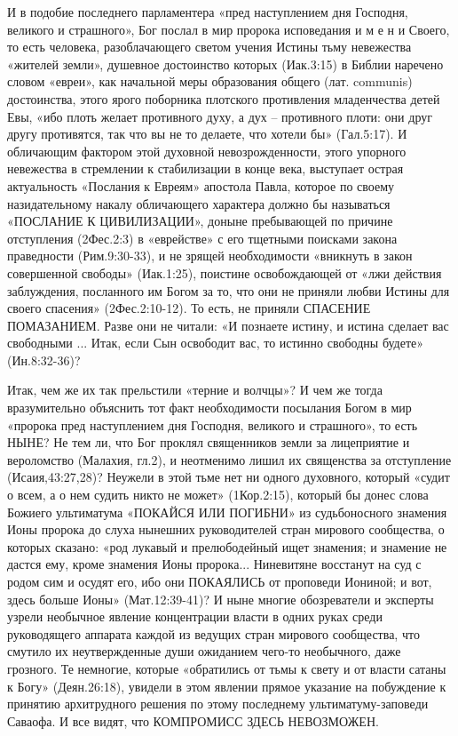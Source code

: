      И в подобие последнего парламентера «пред наступлением дня Господня, великого и страшного», Бог послал в мир пророка исповедания  и м е н и  Своего, то есть человека, разоблачающего светом учения Истины тьму невежества «жителей земли», душевное достоинство которых (Иак.3:15) в Библии наречено словом «евреи», как начальной меры образования общего (лат. communis) достоинства, этого ярого поборника плотского противления младенчества детей Евы, «ибо плоть желает противного духу, а дух – противного плоти: они друг другу противятся, так что вы не то делаете, что хотели бы» (Гал.5:17).
И обличающим фактором этой духовной невозрожденности, этого упорного невежества в стремлении к стабилизации в конце века, выступает острая актуальность «Послания к Евреям» апостола Павла, которое по своему назидательному накалу обличающего характера должно бы называться «ПОСЛАНИЕ К ЦИВИЛИЗАЦИИ», доныне пребывающей по причине отступления (2Фес.2:3) в «еврействе» с его тщетными поисками закона праведности (Рим.9:30-33), и не зрящей необходимости «вникнуть в закон совершенной свободы» (Иак.1:25), поистине освобождающей от «лжи действия заблуждения, посланного им Богом за то, что они не приняли любви Истины для своего спасения» (2Фес.2:10-12). То есть, не приняли  СПАСЕНИЕ  ПОМАЗАНИЕМ. Разве они не читали: «И познаете истину, и истина сделает вас свободными ... Итак, если Сын освободит вас, то истинно свободны будете» (Ин.8:32-36)?

      Итак, чем же их так прельстили «терние и волчцы»?
      И чем же тогда вразумительно объяснить тот факт необходимости посылания Богом в мир «пророка пред наступлением дня Господня, великого и страшного», то есть НЫНЕ? Не тем ли, что Бог проклял священников земли за лицеприятие и вероломство (Малахия, гл.2), и неотменимо лишил их священства за отступление (Исаия,43:27,28)?     Неужели в этой тьме нет ни одного духовного, который «судит о всем, а о нем судить никто не может» (1Кор.2:15), который бы донес слова Божиего ультиматума  «ПОКАЙСЯ  ИЛИ  ПОГИБНИ»  из судьбоносного знамения Ионы пророка до слуха нынешних руководителей стран мирового сообщества, о которых сказано: «род лукавый и прелюбодейный ищет знамения; и знамение не дастся ему, кроме знамения Ионы пророка... Ниневитяне восстанут на суд с родом сим и осудят его, ибо они  ПОКАЯЛИСЬ  от проповеди Иониной; и вот, здесь больше Ионы» (Мат.12:39-41)?
     И ныне многие обозреватели и эксперты узрели необычное явление концентрации власти в одних руках среди руководящего аппарата каждой из ведущих стран мирового сообщества, что смутило их неутвержденные души ожиданием чего-то необычного, даже грозного. Те немногие, которые «обратились от тьмы к свету и от власти сатаны к Богу» (Деян.26:18), увидели в этом явлении прямое указание на побуждение к принятию архитрудного решения по этому последнему ультиматуму-заповеди Саваофа.
И все видят, что  КОМПРОМИСС  ЗДЕСЬ  НЕВОЗМОЖЕН.

